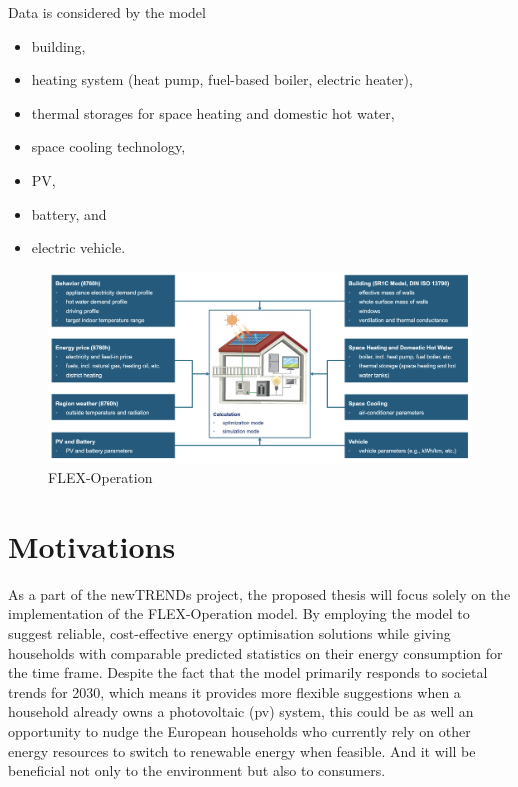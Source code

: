 Data is considered by the model

\begin{itemize}
  \item building,
  \item heating system (heat pump, fuel-based boiler, electric heater),
  \item thermal storages for space heating and domestic hot water,
  \item space cooling technology,
  \item PV,
  \item battery, and
  \item electric vehicle.
\end{itemize}

\begin{figure}[h]
  \centering
  \includegraphics[width=\textwidth]{Images/flex-operation.png}
  \caption{FLEX-Operation}
  \label{fig:flex-operation}
\end{figure}




\section{Motivations}


As a part of the newTRENDs project, 
the proposed thesis will focus solely on the implementation of the FLEX-Operation model.  
By employing the model to 
suggest reliable, cost-effective energy optimisation solutions 
while giving households with comparable predicted statistics on their energy consumption for the time frame. 
Despite the fact that the model primarily responds to societal trends for 2030, 
which means it provides more flexible suggestions when a household already owns a photovoltaic (\gls{pv}) system, 
this could be as well an opportunity to nudge the European households who currently rely on other energy resources
to switch to renewable energy when feasible. 
And it will be beneficial not only to the environment but also to consumers. 


